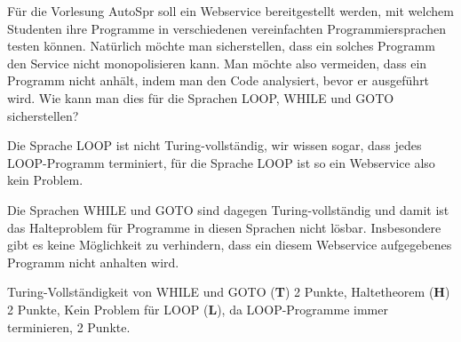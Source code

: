 Für die Vorlesung AutoSpr soll ein Webservice bereitgestellt werden, mit
welchem Studenten ihre Programme in verschiedenen vereinfachten
Programmiersprachen testen können.
Natürlich möchte man sicherstellen, dass ein solches Programm den 
Service nicht monopolisieren kann.
Man möchte also vermeiden, dass ein Programm nicht anhält,
indem man den Code analysiert, bevor er ausgeführt wird.
Wie kann man dies für die Sprachen LOOP, WHILE und GOTO sicherstellen?

\begin{loesung}
Die Sprache LOOP ist nicht Turing-vollständig, wir wissen sogar,
dass jedes LOOP-Pro\-gramm terminiert, für die Sprache LOOP ist so ein
Webservice also kein Problem.

Die Sprachen WHILE und GOTO sind dagegen Turing-vollständig und damit
ist das Halteproblem für Programme in diesen Sprachen nicht lösbar.
Insbesondere gibt es keine Möglichkeit zu verhindern, dass ein diesem
Webservice aufgegebenes Programm nicht anhalten wird.
\end{loesung}

\begin{bewertung}
Turing-Vollständigkeit von WHILE und GOTO ({\bf T}) 2 Punkte,
Haltetheorem ({\bf H}) 2 Punkte,
Kein Problem für LOOP ({\bf L}), da LOOP-Programme immer terminieren, 2 Punkte.
\end{bewertung}


